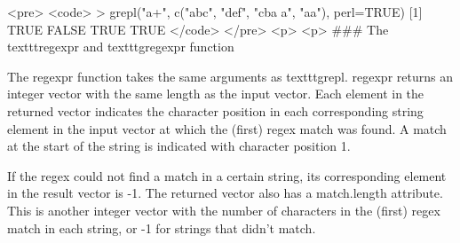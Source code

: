 <pre>
<code>
> grepl("a+", c("abc", "def", "cba a", "aa"), perl=TRUE)
[1] TRUE  FALSE TRUE  TRUE
</code>
</pre>
<p>
<p>
### {The texttt{regexpr} and texttt{gregexpr} function }


The regexpr function takes the same arguments as texttt{grepl}. regexpr returns an integer vector with the same length as the input vector. Each element in the returned vector indicates the character position in each corresponding string element in the input vector at which the (first) regex match was found. A match at the start of the string is indicated with character position 1.

If the regex could not find a match in a certain string, its corresponding element in the result vector is -1. The returned vector also has a match.length attribute. This is another integer vector with the number of characters in the (first) regex match in each string, or -1 for strings that didn't match.

